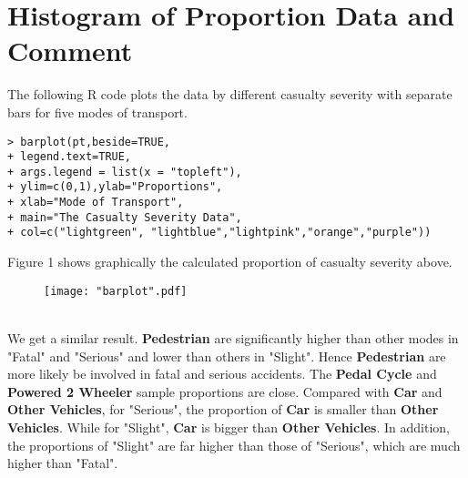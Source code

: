 \documentclass[12pt]{article}
\begin{document}
\section{Histogram of Proportion Data and Comment}
The following R code plots the data by different casualty severity with separate bars for five modes of transport.
\begin{verbatim}
> barplot(pt,beside=TRUE,
+ legend.text=TRUE,
+ args.legend = list(x = "topleft"),
+ ylim=c(0,1),ylab="Proportions",
+ xlab="Mode of Transport",
+ main="The Casualty Severity Data",
+ col=c("lightgreen", "lightblue","lightpink","orange","purple"))
\end{verbatim}
Figure 1 shows graphically the calculated proportion of casualty severity above. 
\begin{figure}[!htb]
	\centering
	\texttt{[image: "barplot".pdf]} 
	\caption{}
\end{figure}\\
We get a similar result. \textbf{Pedestrian} are significantly higher than other modes in "Fatal" and "Serious" and lower than others in "Slight". Hence \textbf{Pedestrian} are more likely be involved in fatal and serious accidents. The \textbf{Pedal Cycle} and \textbf{Powered 2 Wheeler} sample proportions are close. Compared with \textbf{Car} and \textbf{Other Vehicles}, for "Serious", the proportion of \textbf{Car} is smaller than \textbf{Other Vehicles}. While for "Slight", \textbf{Car} is bigger than \textbf{Other Vehicles}. In addition, the proportions of "Slight" are far higher than those of "Serious", which are much higher than "Fatal".  



\end{document}
